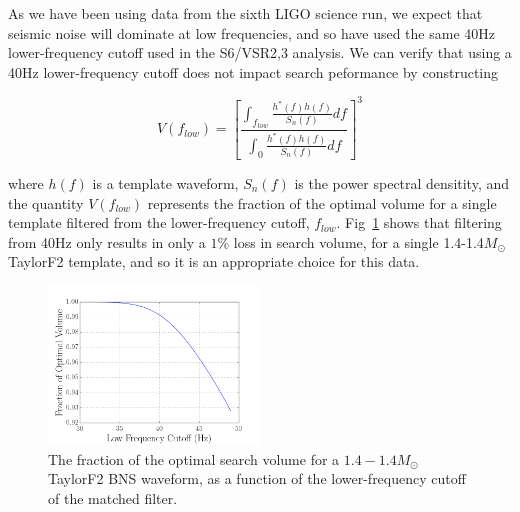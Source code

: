 As we have been using data from the sixth LIGO science run, we expect that seismic noise will dominate at low frequencies, and so have used the same 40Hz lower-frequency cutoff used in the S6/VSR2,3 analysis. We can verify that using a 40Hz lower-frequency cutoff does not impact search peformance by constructing

\begin{equation}
V(f_{low}) = \left[ \frac{\int_{f_{low}} \frac{h^{*}(f)h(f)}{S_n(f)} df}{\int_{0} \frac{h^*(f)h(f)}{S_n(f)} df} \right]^3
\end{equation}

where $h(f)$ is a template waveform, $S_n(f)$ is the power spectral densitity, and the quantity $V(f_{low})$ represents the fraction of the optimal volume for a single template
filtered from the lower-frequency cutoff, $f_{low}$. Fig~\ref{fig:flow} shows that filtering from 40Hz only results in only a $1\%$ loss in search volume, for a single 1.4-1.4$M_\odot$ TaylorF2 template, and so it is an appropriate choice for this data.




\begin{figure}
\centering
\includegraphics[width=0.5\textwidth]{papers/bns_o1_dev/figures/flow.png}
\caption{\label{fig:flow} 
The fraction of the optimal search volume for a $1.4-1.4 M_\odot$ TaylorF2 BNS waveform, as a function of the lower-frequency cutoff of the matched filter. 
}
\end{figure}

